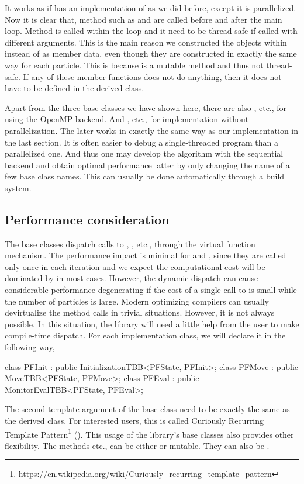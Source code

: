 It works as if  has an implementation of
 as we did before, except it is parallelized. Now it is
clear that, method such as  and  are
called before and after the main loop. Method  is called
within the loop and it need to be thread-safe if called with different
arguments. This is the main reason we constructed the
 objects within  instead of as
member data, even though they are constructed in exactly the same way for each
particle. This is because  is a
mutable method and thus not thread-safe. If any of these member functions does
not do anything, then it does not have to be defined in the derived class.

Apart from the three base classes we have shown here, there are also
, etc., for using the OpenMP backend. And
, etc., for implementation without
parallelization. The later works in exactly the same way as our implementation
in the last section. It is often easier to debug a single-threaded program than
a parallelized one. And thus one may develop the algorithm with the sequential
backend and obtain optimal performance latter by only changing the name of a
few base class names. This can usually be done automatically through a build
system.

\subsection{Performance consideration}
\label{sec:Performance consideration}

The base classes dispatch calls to , ,
etc., through the virtual function mechanism. The performance impact is minimal
for  and , since they are called only
once in each iteration and we expect the computational cost will be dominated
by  in most cases. However, the dynamic dispatch can cause
considerable performance degenerating if the cost of a single call to
 is small while the number of particles is large. Modern
optimizing compilers can usually devirtualize the method calls in trivial
situations. However, it is not always possible. In this situation, the library
will need a little help from the user to make compile-time dispatch. For each
implementation class, we will declare it in the following way,
\begin{cppcode}
  class PFInit : public InitializationTBB<PFState, PFInit>;
  class PFMove : public MoveTBB<PFState, PFMove>;
  class PFEval : public MonitorEvalTBB<PFState, PFEval>;
\end{cppcode}
The second template argument of the base class need to be exactly the same as
the derived class. For interested users, this is called Curiously Recurring
Template
Pattern\footnote{\url{https://en.wikipedia.org/wiki/Curiously_recurring_template_pattern}}
(\crtp). This usage of the library's base classes also provides other
flexibility. The methods  etc., can be either
 or mutable. They can also be .
